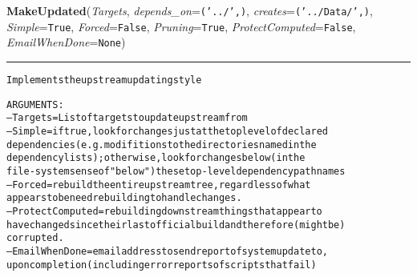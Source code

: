 \hspace{.8\funcindent}\begin{boxedminipage}{\funcwidth}

    \raggedright \textbf{MakeUpdated}(\textit{Targets}, \textit{depends\_on}={\tt ('../',)}, \textit{creates}={\tt ('../Data/',)}, \textit{Simple}={\tt True}, \textit{Forced}={\tt False}, \textit{Pruning}={\tt True}, \textit{ProtectComputed}={\tt False}, \textit{EmailWhenDone}={\tt None})

    \vspace{-1.5ex}

    \rule{\textwidth}{0.5\fboxrule}
\setlength{\parskip}{2ex}
\begin{alltt}

Implements the upstream updating style 

ARGUMENTS:
--Targets = List of targets to update upstream from
--Simple = if true, look for changes just at the top level of declared 
        dependencies (e.g. modifitions to the directories named in the
        dependency lists);  otherwise, look for changes below (in the 
        file-system sense of "below") these top-level dependency path names     
--Forced = rebuild the entire upstream tree, regardless of what 
        appears to be need rebuilding to handle changes. 
--ProtectComputed = rebuilding downstream things that appear to 
        have changed since their last official build and therefore (might be)
        corrupted.
--EmailWhenDone = email address to send report of system update to,
        upon completion (including error reports of scripts that fail)
        
\end{alltt}

\setlength{\parskip}{1ex}
    \end{boxedminipage}

    \label{System:Update:FullUpdate}

    \vspace{0.5ex}

